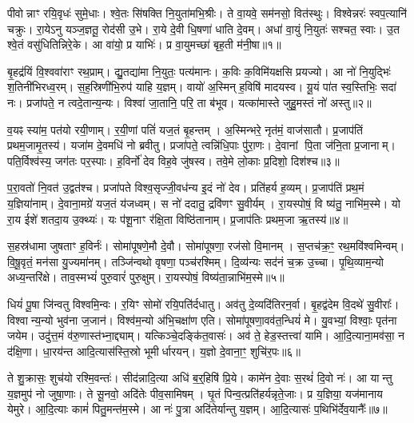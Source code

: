 पीवोन्नाꣳ रयि॒वृधः॑ सुमे॒धाः।
श्वे॒तः सि॑षक्ति नि॒युता॑मभि॒श्रीः।
ते वा॒यवे॒ सम॑नसो॒ वित॑स्थुः।
विश्वेन्नरः॑ स्वप॒त्यानि॑ चक्रुः।
रा॒येऽनु यञ्ज॒ज्ञतू॒ रोद॑सी उ॒भे।
रा॒ये दे॒वी धि॒षणा॑ धाति दे॒वम्।
अधा॑ वा॒युं नि॒युतः॑ सश्चत॒ स्वाः।
उ॒त श्वे॒तं वसु॑धितिन्निरे॒के।
आ वा॑यो॒ प्र याभिः॑।
प्र वा॒युमच्छा॑ बृह॒ती म॑नी॒षा॥१॥

बृ॒हद्र॑यिं वि॒श्ववा॑राꣳ रथ॒प्राम्।
द्यु॒तद्या॑मा नि॒युतः॒ पत्य॑मानः।
क॒विः क॒विमि॑यक्षसि प्रयज्यो।
आ नो॑ नि॒युद्भिः॑ श॒तिनी॑भिरध्व॒रम्।
स॒ह॒स्रिणी॑भि॒रुप॑ याहि य॒ज्ञम्।
वायो॑ अ॒स्मिन् ह॒विषि॑ मादयस्व।
यू॒यं पा॑त स्व॒स्तिभिः॒ सदा॑ नः।
प्रजा॑पते॒ न त्वदे॒तान्य॒न्यः।
विश्वा॑ जा॒तानि॒ परि॒ ता ब॑भूव।
यत्का॑मास्ते जुहु॒मस्तं नो॑ अस्तु॥२॥

व॒यꣴ स्या॑म॒ पत॑यो रयी॒णाम्।
र॒यी॒णां पतिं॑ यज॒तं बृ॒हन्तम्।
अ॒स्मिन्भरे॒ नृत॑मं॒ वाज॑सातौ।
प्र॒जाप॑तिं प्रथम॒जामृ॒तस्य॑।
यजा॑म दे॒वमधि॑ नो ब्रवीतु।
प्रजा॑पते॒ त्वन्नि॑धि॒पाः पु॑रा॒णः।
दे॒वानां पि॒ता ज॑नि॒ता प्र॒जानाम्।
पति॒र्विश्व॑स्य॒ जग॑तः पर॒स्पाः।
ह॒विर्नो॑ देव विह॒वे जु॑षस्व।
तवे॒मे लो॒काः प्र॒दिशो॒ दिश॑श्च॥३॥

प॒रा॒वतो॑ नि॒वत॑ उ॒द्वत॑श्च।
प्रजा॑पते विश्व॒सृज्जी॒वध॑न्य इ॒दं नो॑ देव।
प्रति॑हर्य ह॒व्यम्।
प्र॒जाप॑तिं प्रथ॒मं य॒ज्ञिया॑नाम्।
दे॒वाना॒मग्रे॑ यज॒तं य॑जध्वम्।
स नो॑ ददातु॒ द्रवि॑णꣳ सु॒वीर्यम्।
रा॒यस्पोषं॒ वि ष्य॑तु॒ नाभि॑म॒स्मे।
यो रा॒य ईशे॑ शतदा॒य उ॒क्थ्यः॑।
यः प॑शू॒नाꣳ र॑क्षि॒ता विष्ठि॑तानाम्।
प्र॒जाप॑तिः प्रथम॒जा ऋ॒तस्य॑॥४॥

स॒हस्र॑धामा जुषताꣳ ह॒विर्नः॑।
सोमा॑पूषणे॒मौ दे॒वौ।
सोमा॑पूषणा॒ रज॑सो वि॒मानम्।
स॒प्तच॑क्र॒ꣳ॒ रथ॒मवि॑श्वमिन्वम्।
वि॒षू॒वृतं॒ मन॑सा यु॒ज्यमा॑नम्।
तञ्जि॑न्वथो वृषणा॒ पञ्च॑रश्मिम्।
दि॒व्य॑न्यः सद॑नं च॒क्र उ॒च्चा।
पृ॒थि॒व्याम॒न्यो अध्य॒न्तरि॑क्षे।
ताव॒स्मभ्यं॑ पुरु॒वारं॑ पुरु॒क्षुम्।
रा॒यस्पोषं॒ विष्य॑ता॒न्नाभि॑म॒स्मे॥५॥

धियं॑ पू॒षा जि॑न्वतु विश्वमि॒न्वः।
र॒यिꣳ सोमो॑ रयि॒पति॑र्दधातु।
अव॑तु दे॒व्यदि॑तिरन॒र्वा।
बृ॒हद्व॑देम वि॒दथे॑ सु॒वीराः᳚।
विश्वान्य॒न्यो भुव॑ना ज॒जान॑।
विश्व॑म॒न्यो अ॑भि॒चक्षा॑ण एति।
सोमा॑पूषणा॒वव॑त॒न्धियं॑ मे।
यु॒वभ्यां॒ विश्वाः॒ पृत॑ना जयेम।
उदु॑त्त॒मं व॑रु॒णास्त॑भ्ना॒द्द्याम्।
यत्किञ्चे॒दङ्कि॑त॒वासः॑।
अव॑ ते॒ हेड॒स्तत्त्वा॑ यामि।
आ॒दि॒त्याना॒मव॑सा॒ न द॑क्षि॒णा।
धा॒रय॑न्त आदि॒त्यास॑स्ति॒स्रो भूमीर्धारयन्।
य॒ज्ञो दे॒वाना॒ꣳ॒ शुचि॑र॒पः॥६॥\anuvakamend[म॒नी॒षा\-ऽस्तु॑ च॒र्तस्या॒स्मे कि॑त॒वास॑श्च॒त्वारि॑ च]

ते शु॒क्रासः॒ शुच॑यो रश्मि॒वन्तः॑।
सीद॑न्नादि॒त्या अधि॑ ब॒र्॒हिषि॑ प्रि॒ये।
कामे॑न दे॒वाः स॒रथं॑ दि॒वो नः॑।
आ यान्तु य॒ज्ञमुप॑ नो जुषा॒णाः।
ते सू॒नवो॒ अदि॑तेः पीव॒सामिषम्।
घृ॒तं पिन्व॒त्प्रति॑हर्यन्नृते॒जाः।
प्र य॒ज्ञिया॒ यज॑मानाय येमुरे।
आ॒दि॒त्याः कामं॑ पितु॒मन्त॑म॒स्मे।
आ नः॑ पु॒त्रा अदि॑तेर्यान्तु य॒ज्ञम्।
आ॒दि॒त्यासः॑ प॒थिभि॑र्देव॒यानैः᳚॥७॥

